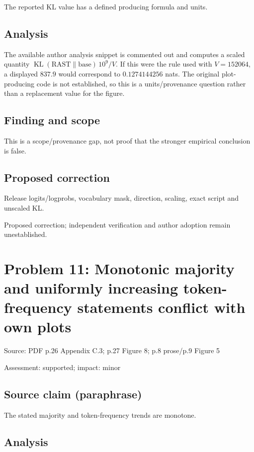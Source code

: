 \documentclass[11pt]{article}
\begin{document}
The reported KL value has a defined producing formula and units.

\subsection*{Analysis}

The available author analysis snippet is commented out and computes a scaled quantity \(\operatorname{KL}(\mathrm{RAST}\|\mathrm{base})\,10^9/V\). If this were the rule used with \(V=152064\), a displayed \(837.9\) would correspond to \(0.1274144256\) nats. The original plot-producing code is not established, so this is a units/provenance question rather than a replacement value for the figure.

\subsection*{Finding and scope}

This is a scope/provenance gap, not proof that the stronger empirical conclusion is false.

\subsection*{Proposed correction}

Release logits/logprobs, vocabulary mask, direction, scaling, exact script and unscaled KL.

Proposed correction; independent verification and author adoption remain unestablished.

\section*{Problem 11: Monotonic majority and uniformly increasing token-frequency statements conflict with own plots}

Source: PDF p.26 Appendix C.3; p.27 Figure 8; p.8 prose/p.9 Figure 5

Assessment: supported; impact: minor

\subsection*{Source claim (paraphrase)}

The stated majority and token-frequency trends are monotone.

\subsection*{Analysis}
\end{document}
